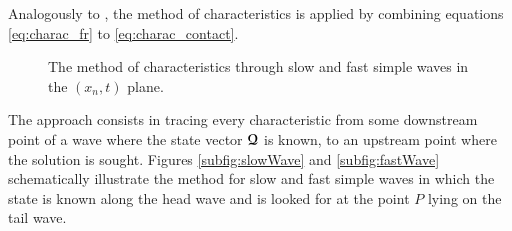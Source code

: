 Analogously to \cite{Clifton}, the method of characteristics is applied by combining equations \eqref{eq:charac_fr} to \eqref{eq:charac_contact}.
\begin{figure}[h!]
  \centering
   \qquad
  \caption{The method of characteristics through slow and fast simple waves in the $(x_n,t)$ plane.}
  \label{fig:charac_method}
\end{figure}
The approach consists in tracing every characteristic from some downstream point of a wave where the state vector ${\boldsymbol{\mathcal{Q}}}$ is known, to an upstream point where the solution is sought.
Figures \ref{subfig:slowWave} and \ref{subfig:fastWave} schematically illustrate the method for slow and fast simple waves in which the state is known along the head wave and is looked for at the point $P$ lying on the tail wave. 

